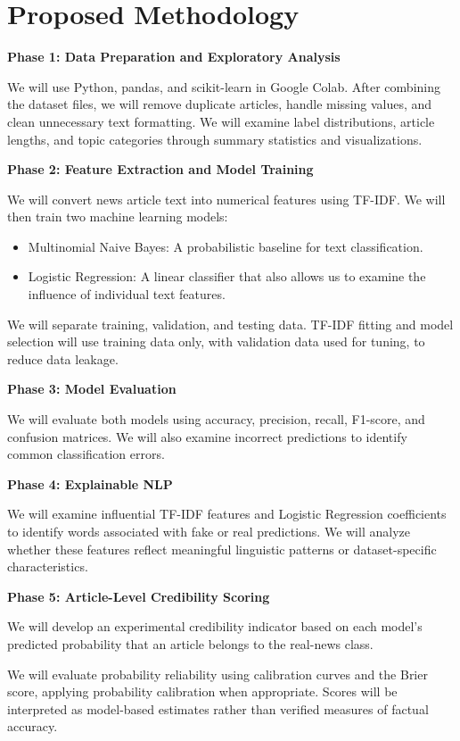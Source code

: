 \documentclass[conference]{IEEEtran}
\begin{document}
\section{Proposed Methodology}
\textbf{Phase 1: Data Preparation and Exploratory Analysis}\par
We will use Python, pandas, and scikit-learn in Google Colab. After combining the dataset files, we will remove duplicate articles, handle missing values, and clean unnecessary text formatting. We will examine label distributions, article lengths, and topic categories through summary statistics and visualizations.\par
\textbf{Phase 2: Feature Extraction and Model Training}\par
We will convert news article text into numerical features using TF-IDF. We will then train two machine learning models:\par
\begin{itemize}
\item Multinomial Naive Bayes: A probabilistic baseline for text classification.
\item Logistic Regression: A linear classifier that also allows us to examine the influence of individual text features.
\end{itemize}
We will separate training, validation, and testing data. TF-IDF fitting and model selection will use training data only, with validation data used for tuning, to reduce data leakage.\par
\textbf{Phase 3: Model Evaluation}\par
We will evaluate both models using accuracy, precision, recall, F1-score, and confusion matrices. We will also examine incorrect predictions to identify common classification errors.\par
\textbf{Phase 4: Explainable NLP}\par
We will examine influential TF-IDF features and Logistic Regression coefficients to identify words associated with fake or real predictions. We will analyze whether these features reflect meaningful linguistic patterns or dataset-specific characteristics.\par
\textbf{Phase 5: Article-Level Credibility Scoring}\par
We will develop an experimental credibility indicator based on each model's predicted probability that an article belongs to the real-news class.\par
We will evaluate probability reliability using calibration curves and the Brier score, applying probability calibration when appropriate. Scores will be interpreted as model-based estimates rather than verified measures of factual accuracy.\par
\end{document}
